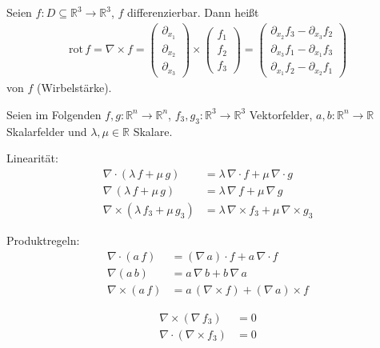\documentclass[a4paper,10pt]{scrbook}
\begin{document}
\begin{theorem}[Definition]
\begin{enum-arab}
    \item Seien $f : D \subseteq \mathbb{R}^3 \to \mathbb{R}^3$, $f$ differenzierbar. Dann heißt
    \begin{align*}
      \mathrm{rot}\, f = \nabla \times f =
      \begin{pmatrix} \partial_{x_1} \\ \partial_{x_2} \\ \partial_{x_3} \end{pmatrix}
      \times
      \begin{pmatrix} f_1 \\ f_2 \\ f_3 \end{pmatrix}
      =
      \begin{pmatrix} \partial_{x_2} f_3 - \partial_{x_3} f_2 \\ \partial_{x_3} f_1 - \partial_{x_1} f_3 \\ \partial_{x_1} f_2 - \partial_{x_2} f_1 \end{pmatrix}
    \end{align*}
     von $f$ (Wirbelstärke).
  \end{enum-arab}
\end{theorem}

\begin{notice}[Rechenregeln:]
  Seien im Folgenden $f,g : \mathbb{R}^n \to \mathbb{R}^n$, $f_3,g_3 : \mathbb{R}^3 \to \mathbb{R}^3$ Vektorfelder, $a,b : \mathbb{R}^n \to \mathbb{R}$ Skalarfelder und $\lambda, \mu \in \mathbb{R}$ Skalare.
  \begin{enum-arab}
    \item Linearität:
    \begin{align*}
      \nabla \cdot (\lambda \, f + \mu \, g) &= \lambda \, \nabla \cdot f + \mu \, \nabla \cdot g \\
      \nabla \, (\lambda \, f + \mu \, g) &= \lambda \, \nabla \, f + \mu \, \nabla \, g \\
      \nabla \times (\lambda \, f_3 + \mu \, g_3) &= \lambda \, \nabla \times f_3 + \mu \, \nabla \times g_3
    \end{align*}

    \item Produktregeln:
    \begin{align*}
      \nabla \cdot (a \, f) &= (\nabla \, a) \cdot f + a \, \nabla \cdot f \\
      \nabla (a \, b) &= a \, \nabla \, b + b \, \nabla \, a \\
      \nabla \times (a \, f) &= a \, (\nabla \times f) + (\nabla \, a) \times f
    \end{align*}

    \item
    \begin{align*}
      \nabla \times (\nabla \, f_3) &= 0 \\
      \nabla \cdot (\nabla \times f_3) &= 0
    \end{align*}
  \end{enum-arab}
\end{notice}
\end{document}

